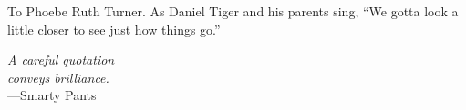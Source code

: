\documentclass[12pt,chapterheads]{UCMerced}
\begin{document}
\begin{frontmatter}
\makefrontmatter %

%
%


\begin{dedication} %
  To Phoebe Ruth Turner. As Daniel Tiger and his parents sing, ``We gotta look a little
  closer to see just how things go.''
\end{dedication}

%   
% 



\begin{epigraph} %
  \emph{A careful quotation\\
  conveys brilliance.}\\
  ---Smarty Pants
\end{epigraph}

% 

\tableofcontents
\listoffigures  %
\listoftables   %



\end{frontmatter}
\end{document}
